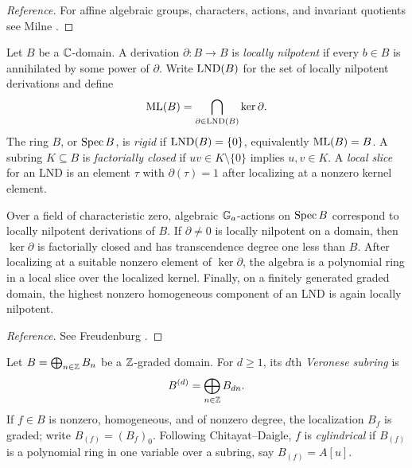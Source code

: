 \begin{proof}[Reference]
For affine algebraic groups, characters, actions, and invariant quotients see Milne \cite[Chapters 2, 12, and 14]{Milne2017}.
\end{proof}

\begin{definition}\label{def:lnd-rigidity}
Let $B$ be a $\mathbb C$-domain.  A derivation $\partial\colon B\to B$ is \emph{locally nilpotent} if every $b\in B$ is annihilated by some power of $\partial$.  Write $\operatorname{LND}(B)$ for the set of locally nilpotent derivations and define
\[
  \operatorname{ML}(B)=\bigcap_{\partial\in\operatorname{LND}(B)}\ker\partial.
\]
The ring $B$, or $\operatorname{Spec} B$, is \emph{rigid} if $\operatorname{LND}(B)=\{0\}$, equivalently $\operatorname{ML}(B)=B$.  A subring $K\subseteq B$ is \emph{factorially closed} if $uv\in K\setminus\{0\}$ implies $u,v\in K$.  A \emph{local slice} for an LND is an element $\tau$ with $\partial(\tau)=1$ after localizing at a nonzero kernel element.
\end{definition}

\begin{recalledtheorem}\label{thm:lnd-standard}
Over a field of characteristic zero, algebraic $\mathbb G_a$-actions on $\operatorname{Spec} B$ correspond to locally nilpotent derivations of $B$.  If $\partial\neq0$ is locally nilpotent on a domain, then $\ker\partial$ is factorially closed and has transcendence degree one less than $B$.  After localizing at a suitable nonzero element of $\ker\partial$, the algebra is a polynomial ring in a local slice over the localized kernel.  Finally, on a finitely generated graded domain, the highest nonzero homogeneous component of an LND is again locally nilpotent.
\end{recalledtheorem}

\begin{proof}[Reference]
See Freudenburg \cite[Chapter 1, especially Sections 1.1--1.3]{Freudenburg2017}.
\end{proof}

\begin{definition}\label{def:cylindrical}
Let $B=\bigoplus_{n\in\mathbb Z}B_n$ be a $\mathbb Z$-graded domain.  For $d\geq1$, its $d$th \emph{Veronese subring} is
\[
  B^{(d)}=\bigoplus_{n\in\mathbb Z}B_{dn}.
\]
If $f\in B$ is nonzero, homogeneous, and of nonzero degree, the localization $B_f$ is graded; write $B_{(f)}=(B_f)_0$.  Following Chitayat--Daigle, $f$ is \emph{cylindrical} if $B_{(f)}$ is a polynomial ring in one variable over a subring, say $B_{(f)}=A[u]$.
\end{definition}

